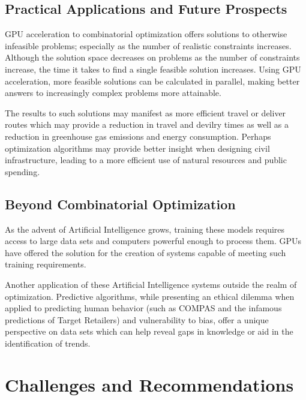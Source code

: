 \documentclass[11pt]{report}
\begin{document}
        \subsection{Practical Applications and Future Prospects} 
        GPU acceleration to combinatorial optimization offers solutions to otherwise infeasible problems; especially as the number of realistic constraints increases. Although the solution space decreases on problems as the number of constraints increase, the time it takes to find a single feasible solution increases. Using GPU acceleration, more feasible solutions can be calculated in parallel, making better answers to increasingly complex problems more attainable.

        The results to such solutions may manifest as more efficient travel or deliver routes which may provide a reduction in travel and devilry times as well as a reduction in greenhouse gas emissions and energy consumption. Perhaps optimization algorithms may provide better insight when designing civil infrastructure, leading to a more efficient use of natural resources and public spending. 

        \subsection{Beyond Combinatorial Optimization}
        As the advent of Artificial Intelligence grows, training these models requires access to large data sets and computers powerful enough to process them. GPUs have offered the solution for the creation of systems capable of meeting such training requirements\cite{GPU_ACCELERATION_OF_AI}.

        Another application of these Artificial Intelligence systems outside the realm of optimization. Predictive algorithms, while presenting an ethical dilemma when applied to predicting human behavior (such as COMPAS\cite{COMPAS_REVIEW} and the infamous predictions of Target Retailers\cite{HOW_COMPANIES_LEARN_YOUR_SECRETS}) and vulnerability to bias\cite{AI_EXPLAINABILITY}, offer a unique perspective on data sets which can help reveal gaps in knowledge or aid in the identification of trends. 

    \section{Challenges and Recommendations}
\end{document}
